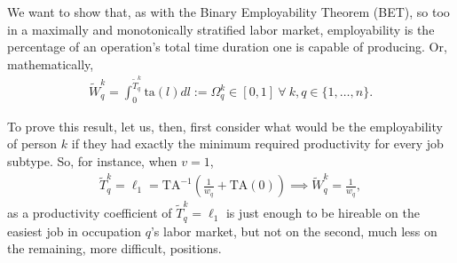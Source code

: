 \documentclass[hidelinks, nonatbib]{elsarticle}
\begin{document}
We want to show that, as with the Binary Employability Theorem (BET), so too in a maximally and monotonically stratified labor market, employability is the percentage of an operation's total time duration one is capable of producing. Or, mathematically,
\begin{gather}
    \tilde{W}_{q}^{k}
    =
    \int_{0}^{\tilde{T}_{q}^{k}}
    \text{ta}(l)
    dl
    :=
    \Omega_{q}^{k}
    \in 
    [0,1]
    \
    \forall
    \
    k,q \in \{1, \dots, n\}
    .
\end{gather}

To prove this result, let us, then, first consider what would be the employability of person $k$ if they had exactly the minimum required productivity for every job subtype. So, for instance, when $v = 1$,
\begin{align}
    \tilde{T}_{q}^{k}
    =
    \ell_1
    =
    \text{TA}^{-1}
    \left(
        \frac{1}{w_q}
        +
        \text{TA}(0)
    \right)
    \implies
    \tilde{W}_{q}^{k}
    =
    \frac{1}{w_q}
    ,
\end{align}
as a productivity coefficient of $\tilde{T}_{q}^{k} = \ell_1$ is just enough to be hireable on the easiest job in occupation $q$'s labor market, but not on the second, much less on the remaining, more difficult, positions.
\end{document}

